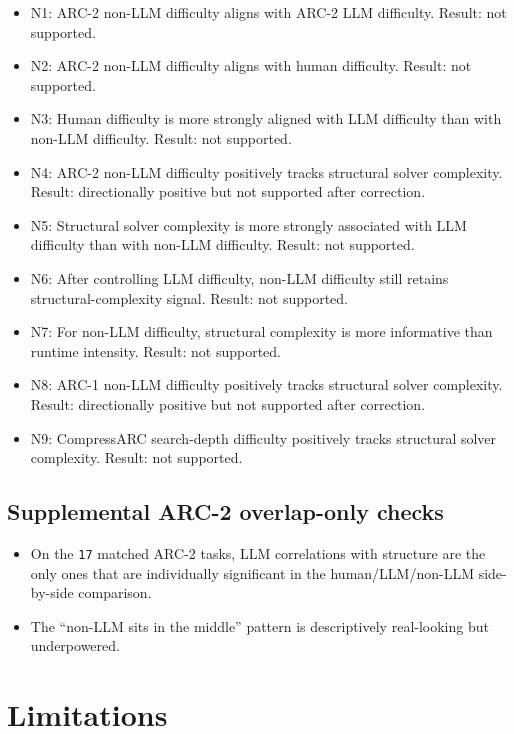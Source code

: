 \documentclass[11pt]{article}
\begin{document}
\begin{itemize}
  \item N1: ARC-2 non-LLM difficulty aligns with ARC-2 LLM difficulty. Result: not supported.
  \item N2: ARC-2 non-LLM difficulty aligns with human difficulty. Result: not supported.
  \item N3: Human difficulty is more strongly aligned with LLM difficulty than with non-LLM difficulty. Result: not supported.
  \item N4: ARC-2 non-LLM difficulty positively tracks structural solver complexity. Result: directionally positive but not supported after correction.
  \item N5: Structural solver complexity is more strongly associated with LLM difficulty than with non-LLM difficulty. Result: not supported.
  \item N6: After controlling LLM difficulty, non-LLM difficulty still retains structural-complexity signal. Result: not supported.
  \item N7: For non-LLM difficulty, structural complexity is more informative than runtime intensity. Result: not supported.
  \item N8: ARC-1 non-LLM difficulty positively tracks structural solver complexity. Result: directionally positive but not supported after correction.
  \item N9: CompressARC search-depth difficulty positively tracks structural solver complexity. Result: not supported.
\end{itemize}

\subsection*{Supplemental ARC-2 overlap-only checks}

\begin{itemize}
  \item On the \texttt{17} matched ARC-2 tasks, LLM correlations with structure are the only ones that are individually significant in the human/LLM/non-LLM side-by-side comparison.
  \item The ``non-LLM sits in the middle'' pattern is descriptively real-looking but underpowered.
\end{itemize}

\section*{Limitations}
\end{document}
